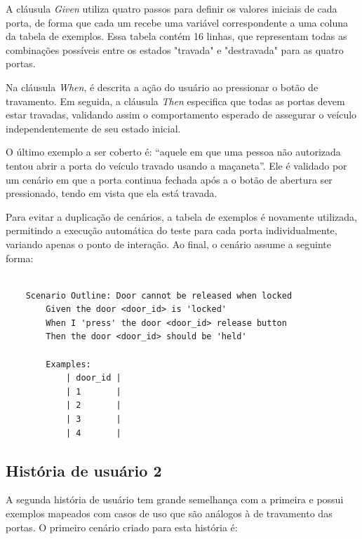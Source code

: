 A cláusula \textit{Given} utiliza quatro passos para definir os valores iniciais de cada porta, de forma que cada um recebe uma variável correspondente a uma coluna da 
tabela de exemplos. Essa tabela contém 16 linhas, que representam todas as combinações possíveis entre os estados "travada" e "destravada" para as quatro portas.

Na cláusula \textit{When}, é descrita a ação do usuário ao pressionar o botão de travamento. Em seguida, a cláusula \textit{Then} especifica que todas as portas devem estar travadas, 
validando assim o comportamento esperado de assegurar o veículo independentemente de seu estado inicial.

O último exemplo a ser coberto é: “aquele em que uma pessoa não autorizada tentou abrir a porta do veículo travado usando a maçaneta”. Ele é validado por um 
cenário em que a porta continua fechada após a o botão de abertura ser pressionado, tendo em vista que ela está travada.

Para evitar a duplicação de cenários, a tabela de exemplos é novamente utilizada, permitindo a execução automática do teste para cada porta individualmente, variando 
apenas o ponto de interação. Ao final, o cenário assume a seguinte forma:

\begin{verbatim}

    Scenario Outline: Door cannot be released when locked
        Given the door <door_id> is 'locked'
        When I 'press' the door <door_id> release button
        Then the door <door_id> should be 'held'

        Examples:
            | door_id |
            | 1       |
            | 2       |
            | 3       |
            | 4       |

\end{verbatim}


\subsection{História de usuário 2}

A segunda história de usuário tem grande semelhança com a primeira e possui exemplos mapeados com casos de uso que são análogos à de travamento das portas. O 
primeiro cenário criado para esta história é:

